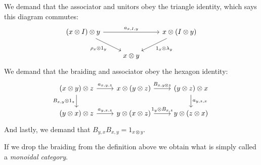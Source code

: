 \documentclass[TFM.tex]{subfiles}
\begin{document}
\begin{defi}
\[\]
We demand that the associator and unitors obey the triangle identity, which says this diagram commutes:
\[
\begin{tikzcd}
(x\otimes I)\otimes y \arrow[rr, "{a_{x,I,y}}"] \arrow[rd, "\rho_x\otimes 1_y"'] &            & x\otimes (I\otimes y) \arrow[ld, "1_x\otimes\lambda_y"] \\
                                                                                 & x\otimes y &                                                        
\end{tikzcd}
\]
We demand that the braiding and associator obey the hexagon identity:
\[
\begin{tikzcd}
(x\otimes y)\otimes z \arrow[r, "{a_{x,y,z}}"] \arrow[d, "{B_{x,y}\otimes 1_z}"'] & x\otimes (y\otimes z) \arrow[r, "{B_{x,y\otimes z}}"]   & (y\otimes z)\otimes x \arrow[d, "{a_{y,z,x}}"] \\
(y\otimes x)\otimes z \arrow[r, "{a_{y,x,z}}"]                                    & y\otimes (x\otimes z) \arrow[r, "{1_y\otimes B_{x,z}}"] & y\otimes (z\otimes x)                         
\end{tikzcd}
\]
And lastly, we demand that $B_{y,x}B_{x,y}=1_{x\otimes y}$.
\end{defi}

If we drop the braiding from the definition above we obtain what is simply called a \emph{monoidal category}.
\end{document}
